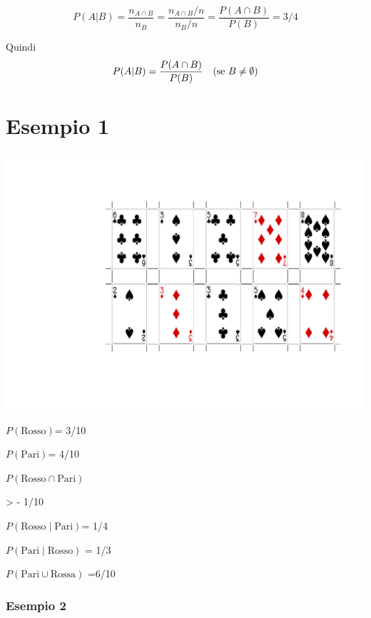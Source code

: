 \documentclass[onecolumn,12pt]{book}\usepackage[]{graphicx}\usepackage[]{color}
\makeatletter
\def\maxwidth{ %
  \ifdim\Gin@nat@width>\linewidth
    \linewidth
  \else
    \Gin@nat@width
  \fi
}
\newenvironment{knitrout}{}{} %
\makeatother
\begin{document}
$$P(A| B)=\frac{n_{A\cap B}}{n_{B}}=\frac{n_{A\cap B}/n}{n_{B}/n}=\frac{P({A\cap B})}{P(B)}=3/4$$

Quindi 
$$P(A| B)=\frac{P({A\cap B})}{P(B)}\quad (\hbox{se } B\neq \emptyset)$$

\section{Esempio  1}

\begin{knitrout}
\color{fgcolor}
\includegraphics[width=\maxwidth]{figure/unnamed-chunk-8-1} 

\end{knitrout}



\(P(\textrm{Rosso})\)= 3/10

\(P(\textrm{Pari})\)=  4/10
 
\(P(\textrm{Rosso}\cap \textrm{Pari})\)

> - 1/10

\(P(\textrm{Rosso}\mid \textrm{Pari}) \)= 1/4

\(P(\textrm{Pari}\mid \textrm{Rosso}) \)
= 1/3

\(P(\textrm{Pari}\cup\textrm{Rossa})\)
=6/10

\subsubsection{Esempio 2}
\end{document}
